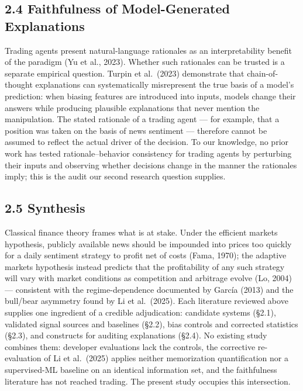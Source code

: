 \documentclass[
  12pt,
]{article}
\begin{document}
\hypertarget{faithfulness-of-model-generated-explanations}{%
\subsection{2.4 Faithfulness of Model-Generated
Explanations}\label{faithfulness-of-model-generated-explanations}}

Trading agents present natural-language rationales as an
interpretability benefit of the paradigm (Yu et al., 2023). Whether such
rationales can be trusted is a separate empirical question. Turpin et
al.~(2023) demonstrate that chain-of-thought explanations can
systematically misrepresent the true basis of a model's prediction: when
biasing features are introduced into inputs, models change their answers
while producing plausible explanations that never mention the
manipulation. The stated rationale of a trading agent --- for example,
that a position was taken on the basis of news sentiment --- therefore
cannot be assumed to reflect the actual driver of the decision. To our
knowledge, no prior work has tested rationale--behavior consistency for
trading agents by perturbing their inputs and observing whether
decisions change in the manner the rationales imply; this is the audit
our second research question supplies.

\hypertarget{synthesis}{%
\subsection{2.5 Synthesis}\label{synthesis}}

Classical finance theory frames what is at stake. Under the efficient
markets hypothesis, publicly available news should be impounded into
prices too quickly for a daily sentiment strategy to profit net of costs
(Fama, 1970); the adaptive markets hypothesis instead predicts that the
profitability of any such strategy will vary with market conditions as
competition and arbitrage evolve (Lo, 2004) --- consistent with the
regime-dependence documented by García (2013) and the bull/bear
asymmetry found by Li et al.~(2025). Each literature reviewed above
supplies one ingredient of a credible adjudication: candidate systems
(§2.1), validated signal sources and baselines (§2.2), bias controls and
corrected statistics (§2.3), and constructs for auditing explanations
(§2.4). No existing study combines them: developer evaluations lack the
controls, the corrective re-evaluation of Li et al.~(2025) applies
neither memorization quantification nor a supervised-ML baseline on an
identical information set, and the faithfulness literature has not
reached trading. The present study occupies this intersection.
\end{document}
